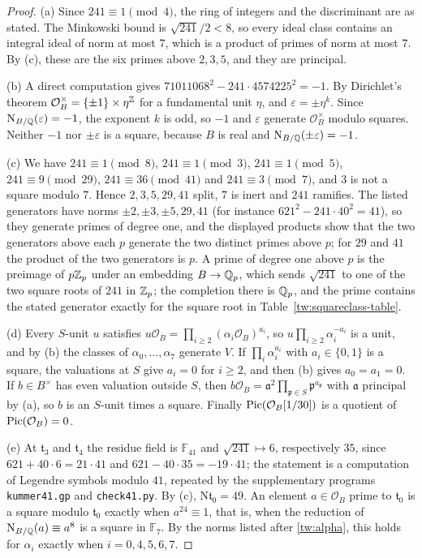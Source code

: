 \begin{proof}
(a) Since $241\equiv1\pmod 4$, the ring of integers and the discriminant are
as stated. The Minkowski bound is $\sqrt{241}/2<8$, so every ideal class
contains an integral ideal of norm at most $7$, which is a product of primes
of norm at most $7$. By (c), these are the six primes above $2,3,5$, and they
are principal.

(b) A direct computation gives $71011068^2-241\cdot4574225^2=-1$. By
Dirichlet's theorem $\mathcal O_B^\times=\{\pm1\}\times\eta^{\mathbb Z}$ for a
fundamental unit $\eta$, and $\varepsilon=\pm\eta^k$. Since
$\mathrm N_{B/\mathbb Q}(\varepsilon)=-1$, the exponent $k$ is odd, so $-1$ and
$\varepsilon$ generate $\mathcal O_B^\times$ modulo squares. Neither $-1$ nor
$\pm\varepsilon$ is a square, because $B$ is real and
$\mathrm N_{B/\mathbb Q}(\pm\varepsilon)=-1$.

(c) We have $241\equiv1\pmod8$, $241\equiv1\pmod3$, $241\equiv1\pmod5$,
$241\equiv9\pmod{29}$, $241\equiv36\pmod{41}$ and $241\equiv3\pmod7$, and $3$
is not a square modulo $7$. Hence $2,3,5,29,41$ split, $7$ is inert and $241$
ramifies. The listed generators have norms $\pm2,\pm3,\pm5,29,41$ (for
instance $621^2-241\cdot40^2=41$), so they generate primes of degree one, and
the displayed products show that the two generators above each $p$ generate
the two distinct primes above $p$; for $29$ and $41$ the product of the two
generators is $p$. A prime of degree one above $p$ is the preimage of
$p\mathbb Z_p$ under an embedding $B\to\mathbb Q_p$, which sends $\sqrt{241}$ to one of
the two square roots of $241$ in $\mathbb Z_p$; the completion there is $\mathbb Q_p$, and
the prime contains the stated generator exactly for the square root in
Table~\ref{tw:squareclass-table}.

(d) Every $S$-unit $u$ satisfies
$u\mathcal O_B=\prod_{i\ge2}(\alpha_i\mathcal O_B)^{a_i}$, so
$u\prod_{i\ge2}\alpha_i^{-a_i}$ is a unit, and by (b) the classes of
$\alpha_0,\dots,\alpha_7$ generate $V$. If $\prod_i\alpha_i^{a_i}$ with
$a_i\in\{0,1\}$ is a square, the valuations at $S$ give $a_i=0$ for $i\ge2$,
and then (b) gives $a_0=a_1=0$. If $b\in B^\times$ has even valuation outside
$S$, then
$b\mathcal O_B=\mathfrak a^2\prod_{\mathfrak p\in S}\mathfrak p^{a_{\mathfrak p}}$
with $\mathfrak a$ principal by (a), so $b$ is an $S$-unit times a square.
Finally $\operatorname{Pic}(\mathcal O_B[1/30])$ is a quotient of $\operatorname{Pic}(\mathcal O_B)=0$.

(e) At $\mathfrak t_3$ and $\mathfrak t_4$ the residue field is $\mathbb F_{41}$
and $\sqrt{241}\mapsto6$, respectively $35$, since $621+40\cdot6=21\cdot41$
and $621-40\cdot35=-19\cdot41$; the statement is a computation of Legendre
symbols modulo $41$, repeated by the supplementary programs
\texttt{kummer41.gp} and \texttt{check41.py}. By (c), $\mathrm N\mathfrak t_0=49$. An
element $a\in\mathcal O_B$ prime to
$\mathfrak t_0$ is a square modulo $\mathfrak t_0$ exactly when
$a^{24}\equiv1$, that is, when the reduction of $\mathrm N_{B/\mathbb Q}(a)\equiv a^8$ is a
square in $\mathbb F_7$. By the norms listed after \eqref{tw:alpha}, this
holds for $\alpha_i$ exactly when $i=0,4,5,6,7$.
\end{proof}

